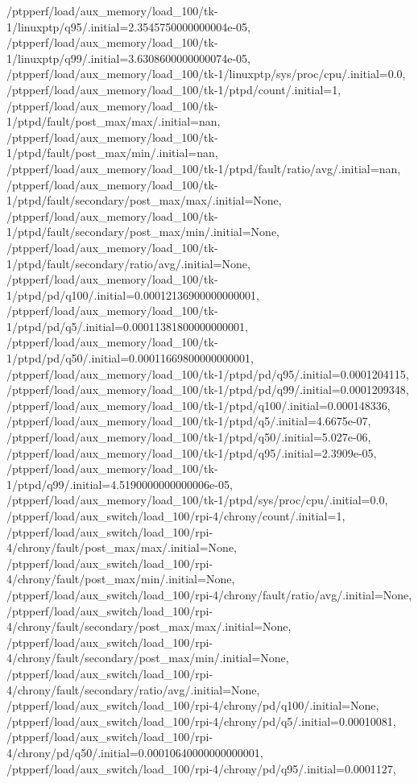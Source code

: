 {    /ptpperf/load/aux_memory/load_100/tk-1/linuxptp/q95/.initial=2.3545750000000004e-05,
    /ptpperf/load/aux_memory/load_100/tk-1/linuxptp/q99/.initial=3.6308600000000074e-05,
    /ptpperf/load/aux_memory/load_100/tk-1/linuxptp/sys/proc/cpu/.initial=0.0,
    /ptpperf/load/aux_memory/load_100/tk-1/ptpd/count/.initial=1,
    /ptpperf/load/aux_memory/load_100/tk-1/ptpd/fault/post_max/max/.initial=nan,
    /ptpperf/load/aux_memory/load_100/tk-1/ptpd/fault/post_max/min/.initial=nan,
    /ptpperf/load/aux_memory/load_100/tk-1/ptpd/fault/ratio/avg/.initial=nan,
    /ptpperf/load/aux_memory/load_100/tk-1/ptpd/fault/secondary/post_max/max/.initial=None,
    /ptpperf/load/aux_memory/load_100/tk-1/ptpd/fault/secondary/post_max/min/.initial=None,
    /ptpperf/load/aux_memory/load_100/tk-1/ptpd/fault/secondary/ratio/avg/.initial=None,
    /ptpperf/load/aux_memory/load_100/tk-1/ptpd/pd/q100/.initial=0.00012136900000000001,
    /ptpperf/load/aux_memory/load_100/tk-1/ptpd/pd/q5/.initial=0.00011381800000000001,
    /ptpperf/load/aux_memory/load_100/tk-1/ptpd/pd/q50/.initial=0.00011669800000000001,
    /ptpperf/load/aux_memory/load_100/tk-1/ptpd/pd/q95/.initial=0.0001204115,
    /ptpperf/load/aux_memory/load_100/tk-1/ptpd/pd/q99/.initial=0.0001209348,
    /ptpperf/load/aux_memory/load_100/tk-1/ptpd/q100/.initial=0.000148336,
    /ptpperf/load/aux_memory/load_100/tk-1/ptpd/q5/.initial=4.6675e-07,
    /ptpperf/load/aux_memory/load_100/tk-1/ptpd/q50/.initial=5.027e-06,
    /ptpperf/load/aux_memory/load_100/tk-1/ptpd/q95/.initial=2.3909e-05,
    /ptpperf/load/aux_memory/load_100/tk-1/ptpd/q99/.initial=4.5190000000000006e-05,
    /ptpperf/load/aux_memory/load_100/tk-1/ptpd/sys/proc/cpu/.initial=0.0,
    /ptpperf/load/aux_switch/load_100/rpi-4/chrony/count/.initial=1,
    /ptpperf/load/aux_switch/load_100/rpi-4/chrony/fault/post_max/max/.initial=None,
    /ptpperf/load/aux_switch/load_100/rpi-4/chrony/fault/post_max/min/.initial=None,
    /ptpperf/load/aux_switch/load_100/rpi-4/chrony/fault/ratio/avg/.initial=None,
    /ptpperf/load/aux_switch/load_100/rpi-4/chrony/fault/secondary/post_max/max/.initial=None,
    /ptpperf/load/aux_switch/load_100/rpi-4/chrony/fault/secondary/post_max/min/.initial=None,
    /ptpperf/load/aux_switch/load_100/rpi-4/chrony/fault/secondary/ratio/avg/.initial=None,
    /ptpperf/load/aux_switch/load_100/rpi-4/chrony/pd/q100/.initial=None,
    /ptpperf/load/aux_switch/load_100/rpi-4/chrony/pd/q5/.initial=0.00010081,
    /ptpperf/load/aux_switch/load_100/rpi-4/chrony/pd/q50/.initial=0.00010640000000000001,
    /ptpperf/load/aux_switch/load_100/rpi-4/chrony/pd/q95/.initial=0.0001127,
}
